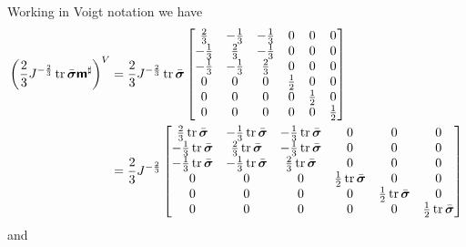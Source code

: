 Working in Voigt notation we have
\begin{equation}
  \begin{split}
    \pbrac{\dfrac{2}{3}J^{-\frac{2}{3}}\trop\bar{\tensortwo{\sigma}}\tensorfour{m}^{\sharp}}^{V}&=\dfrac{2}{3}J^{-\frac{2}{3}}\trop\bar{\tensortwo{\sigma}}\begin{bmatrix}
      \frac{2}{3} & -\frac{1}{3} & -\frac{1}{3} & 0 & 0 & 0 \\
      -\frac{1}{3} & \frac{2}{3} & -\frac{1}{3} & 0 & 0 & 0 \\
      -\frac{1}{3} & -\frac{1}{3} & \frac{2}{3} & 0 & 0 & 0 \\
      0 & 0 & 0 & \frac{1}{2} & 0 & 0 \\
      0 & 0 & 0 & 0 & \frac{1}{2} & 0 \\
      0 & 0 & 0 & 0 & 0 & \frac{1}{2}
    \end{bmatrix} \\
    &=\dfrac{2}{3}J^{-\frac{2}{3}}\begin{bmatrix}
       \frac{2}{3}\trace{}{\bar{\tensor{\sigma}}} &
      -\frac{1}{3}\trace{}{\bar{\tensor{\sigma}}} &
      -\frac{1}{3}\trace{}{\bar{\tensor{\sigma}}} & 0 & 0 & 0 \\
      -\frac{1}{3}\trace{}{\bar{\tensor{\sigma}}} &
       \frac{2}{3}\trace{}{\bar{\tensor{\sigma}}} &
      -\frac{1}{3}\trace{}{\bar{\tensor{\sigma}}} & 0 & 0 & 0 \\
      -\frac{1}{3}\trace{}{\bar{\tensor{\sigma}}} &
      -\frac{1}{3}\trace{}{\bar{\tensor{\sigma}}} &
       \frac{2}{3}\trace{}{\bar{\tensor{\sigma}}} & 0 & 0 & 0 \\
       0 & 0 & 0 & \frac{1}{2}\trace{}{\bar{\tensor{\sigma}}} & 0 & 0 \\
       0 & 0 & 0 & 0 & \frac{1}{2}\trace{}{\bar{\tensor{\sigma}}} & 0 \\
       0 & 0 & 0 & 0 & 0 & \frac{1}{2}\trace{}{\bar{\tensor{\sigma}}} \\
    \end{bmatrix} 
  \end{split}
\end{equation}
and
